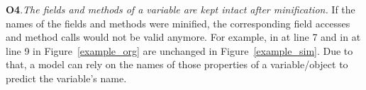 \textbf{O4}.{\em The fields and methods of a variable are kept intact
  after minification.} If the names of the fields and methods were
minified, the corresponding field accesses and method calls would not
be valid anymore. For example,  in
 at line 7 and  in
 at line 9 in Figure~\ref{example_org} are
unchanged in Figure~\ref{example_sim}. Due to that, a model can rely
on the names of those properties of a variable/object to predict the
variable's name.















